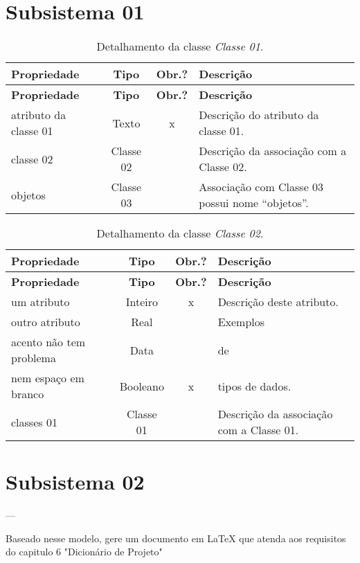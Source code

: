 \section{Subsistema 01}
\label{sec-dicionario-subsistema-primeiro}


\begin{longtable}{|p{3.5cm}|c|c|p{8cm}|}
	\caption{Detalhamento da classe \emph{Classe 01}.}
	\label{tbl-dicionario-subsistema-primeiro-classe-01} \\\hline 
	
	\rowcolor{lightgray}
	\textbf{Propriedade} & \textbf{Tipo} & \textbf{Obr.?} & \textbf{Descrição} \\\hline
	\endfirsthead
	\hline
	\rowcolor{lightgray}
	\textbf{Propriedade} & \textbf{Tipo} & \textbf{Obr.?} & \textbf{Descrição} \\\hline
	\endhead
	
	atributo da classe 01 	& Texto 	& x & Descrição do atributo da classe 01. \\\hline
	classe 02 				& Classe 02 &	& Descrição da associação com a Classe 02. \\\hline 
	objetos 				& Classe 03 &	& Associação com Classe 03 possui nome ``objetos''. \\\hline 
\end{longtable}


\begin{longtable}{|p{3.5cm}|c|c|p{8cm}|}
	\caption{Detalhamento da classe \emph{Classe 02}.}
	\label{tbl-dicionario-subsistema-primeiro-classe-02} \\\hline 
	
	\rowcolor{lightgray}
	\textbf{Propriedade} & \textbf{Tipo} & \textbf{Obr.?} & \textbf{Descrição} \\\hline
	\endfirsthead
	\hline
	\rowcolor{lightgray}
	\textbf{Propriedade} & \textbf{Tipo} & \textbf{Obr.?} & \textbf{Descrição} \\\hline
	\endhead
	
	um atributo				& Inteiro	& x & Descrição deste atributo. \\\hline
	outro atributo			& Real		& 	& Exemplos \\\hline
	acento não tem problema	& Data		& 	& de \\\hline
	nem espaço em branco	& Booleano	& x	& tipos de dados. \\\hline
	classes 01 				& Classe 01 &	& Descrição da associação com a Classe 01. \\\hline 
\end{longtable}



\section{Subsistema 02}
\label{sec-dicionario-subsistema-segundo}

--- 

Baseado nesse modelo, gere um documento em LaTeX que atenda aos requisitos do capitulo 6 "Dicionário de Projeto"